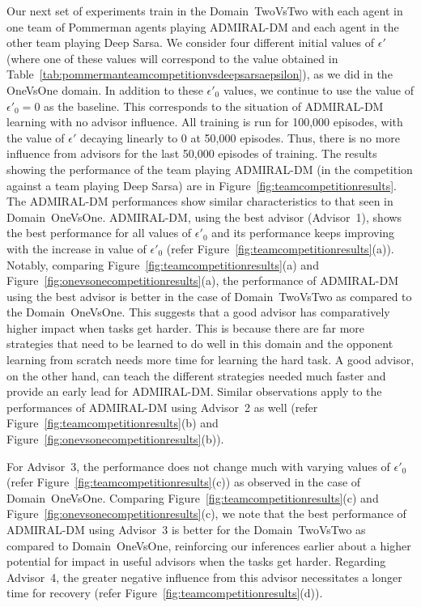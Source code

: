 \documentclass[jair, twoside,11pt,theapa]{article}
\begin{document}
 
 Our next set of experiments train in the Domain~TwoVsTwo with each agent in one team of Pommerman agents playing ADMIRAL-DM and each agent in the other team playing Deep Sarsa. We  consider four different initial values of $\epsilon'$ (where one of these values will correspond to the value obtained in Table~\ref{tab:pommermanteamcompetitionvsdeepsarsaepsilon}), as we did in the  OneVsOne domain. In addition to these $\epsilon'_0$ values, we  continue to use the value of $\epsilon'_0=0$ as the baseline. This corresponds to the situation of ADMIRAL-DM learning with no advisor influence. All training is run for 100,000 episodes, with the value of $\epsilon'$ decaying linearly to 0  at 50,000 episodes. Thus, there is no more influence from advisors for the last 50,000 episodes of training. The results showing the performance of the team playing ADMIRAL-DM (in the competition against a team playing Deep Sarsa) are in Figure~\ref{fig:teamcompetitionresults}. The ADMIRAL-DM performances show similar characteristics to that seen in Domain~OneVsOne. ADMIRAL-DM, using the best advisor (Advisor~1), shows the best performance for all values of $\epsilon'_0$ and its performance keeps improving with the increase in value of $\epsilon'_0$ (refer Figure~\ref{fig:teamcompetitionresults}(a)). Notably, comparing Figure~\ref{fig:teamcompetitionresults}(a) and Figure~\ref{fig:onevsonecompetitionresults}(a), the performance of ADMIRAL-DM using the best advisor is better in the case of Domain~TwoVsTwo as compared to the Domain~OneVsOne. This suggests that a good advisor has comparatively higher impact when tasks get harder. This is because there are far more strategies that need to be learned to do well in this domain and the opponent learning from scratch needs more time for learning the hard task. A good advisor, on the other hand, can teach the different strategies needed much faster and provide an early lead for ADMIRAL-DM. Similar observations apply to   the performances of ADMIRAL-DM using Advisor~2 as well (refer Figure~\ref{fig:teamcompetitionresults}(b) and Figure~\ref{fig:onevsonecompetitionresults}(b)).     
 
 
 For Advisor~3, the performance does not change much with varying values of $\epsilon'_0$ (refer Figure~\ref{fig:teamcompetitionresults}(c)) as observed in the case of Domain~OneVsOne. Comparing Figure~\ref{fig:teamcompetitionresults}(c) and Figure~\ref{fig:onevsonecompetitionresults}(c), we note that the best performance of ADMIRAL-DM using  Advisor~3 is better for the Domain~TwoVsTwo as compared to Domain~OneVsOne, reinforcing our inferences earlier about a higher potential for impact in useful advisors when the tasks get harder. Regarding Advisor~4, the greater negative influence from this advisor necessitates a longer time for recovery (refer Figure~\ref{fig:teamcompetitionresults}(d)). 
 
\end{document}
